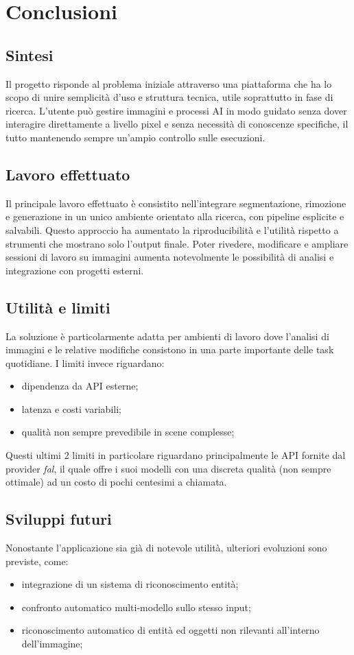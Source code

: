 \documentclass[oneside]{supsistudent}
\begin{document}
\chapter{Conclusioni}

\section{Sintesi}
Il progetto risponde al problema iniziale attraverso una piattaforma che ha lo scopo di unire semplicità d'uso e struttura tecnica, utile soprattutto
in fase di ricerca. L'utente può gestire immagini e processi AI in modo guidato senza dover interagire direttamente
a livello pixel e senza necessità di conoscenze specifiche, il tutto mantenendo sempre un'ampio controllo sulle esecuzioni.

\section{Lavoro effettuato}
Il principale lavoro effettuato è consistito nell'integrare segmentazione, rimozione e generazione in un unico ambiente orientato alla ricerca,
con pipeline esplicite e salvabili. \newline
Questo approccio ha aumentato la riproducibilità e l'utilità rispetto a strumenti che mostrano solo l'output finale. Poter rivedere, modificare e ampliare sessioni
di lavoro su immagini aumenta notevolmente le possibilità di analisi e integrazione con progetti esterni.

\section{Utilità e limiti}
La soluzione è particolarmente adatta per ambienti di lavoro dove l'analisi di immagini e le relative modifiche
consistono in una parte importante delle task quotidiane. I limiti invece riguardano:
\begin{itemize}
  \item dipendenza da API esterne;
  \item latenza e costi variabili;
  \item qualità non sempre prevedibile in scene complesse;
\end{itemize}
Questi ultimi 2 limiti in particolare riguardano principalmente le API fornite dal provider \emph{fal}, il quale offre i suoi  modelli con una
discreta qualità (non sempre ottimale) ad un costo di pochi centesimi a chiamata.

\section{Sviluppi futuri}
Nonostante l'applicazione sia già di notevole utilità, ulteriori evoluzioni sono previste, come:
\begin{itemize}
  \item integrazione di un sistema di riconoscimento entità;
  \item confronto automatico multi-modello sullo stesso input;
  \item riconoscimento automatico di entità ed oggetti non rilevanti all'interno dell'immagine;
\end{itemize}
\end{document}
